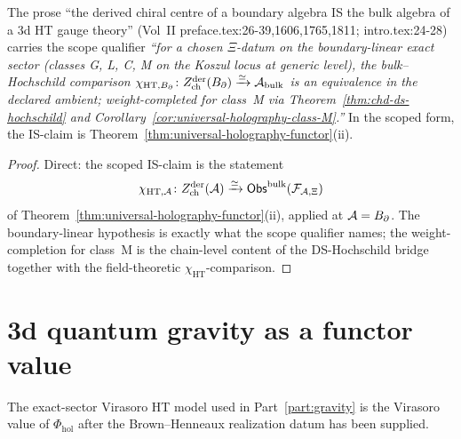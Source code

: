 \begin{proposition}
\label{prop:uhf-universal-scope}
The prose ``the derived chiral centre of a boundary algebra IS
the bulk algebra of a 3d HT gauge theory'' (Vol~II
preface.tex:26-39,1606,1765,1811; intro.tex:24-28) carries the
scope qualifier \emph{``for a chosen \(\Xi\)-datum on the
boundary-linear exact sector \textup{(}classes G, L, C, M on the
Koszul locus at generic level\textup{)}, the bulk--Hochschild
comparison
\(\chi_{\mathrm{HT},B_\partial}\colon
Z^{\mathrm{der}}_{\mathrm{ch}}(B_\partial)\xrightarrow{\simeq}
\mathcal{A}_{\mathrm{bulk}}\)
is an equivalence in the declared ambient; weight-completed for
class~M via Theorem~\ref*{thm:chd-ds-hochschild} and
Corollary~\ref*{cor:universal-holography-class-M}.''} In the scoped
form, the IS-claim is Theorem~\ref{thm:universal-holography-functor}(ii).
\end{proposition}

\begin{proof}
Direct: the scoped IS-claim is the statement
\[
\chi_{\mathrm{HT},\mathcal{A}}\colon
Z^{\mathrm{der}}_{\mathrm{ch}}(\mathcal{A})\xrightarrow{\simeq}
\mathsf{Obs}^{\mathrm{bulk}}(\mathcal{F}_{\mathcal{A},\Xi})
\]
of
Theorem~\ref{thm:universal-holography-functor}(ii), applied at
\(\mathcal{A} = B_\partial\). The boundary-linear hypothesis is exactly what
the scope qualifier names; the weight-completion for class~M is the
chain-level content of the DS-Hochschild bridge together with the
field-theoretic \(\chi_{\mathrm{HT}}\)-comparison.
\end{proof}

\section{3d quantum gravity as a functor value}
\label{sec:uhf-gravity-theorem}

The exact-sector Virasoro HT model used in
Part~\ref*{part:gravity} is the Virasoro value of
$\Phi_{\mathrm{hol}}$ after the Brown--Henneaux realization datum has
been supplied.

